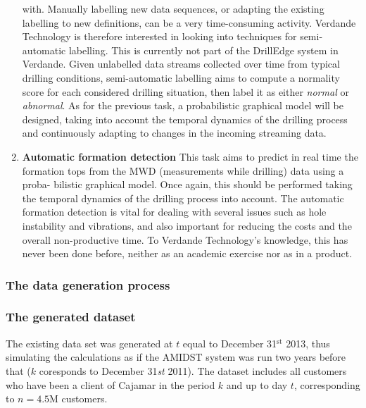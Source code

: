 \documentclass{article}
\theoremstyle{theorem}
\theoremstyle{definition}
\begin{document}
\begin{enumerate}
with. Manually labelling new data sequences, or adapting the existing labelling to
new definitions, can be a very time-consuming activity. Verdande Technology is
therefore interested in looking into techniques for semi-automatic labelling. This
is currently not part of the DrillEdge system in Verdande.
Given unlabelled data streams collected over time from typical drilling conditions,
semi-automatic labelling aims to compute a normality score for each considered
drilling situation, then label it as either \emph{normal} or \emph{abnormal}. As for the
previous task, a probabilistic graphical model will be designed, taking into account
the temporal dynamics of the drilling process and continuously adapting to changes
in the incoming streaming data.
\item {\bf Automatic formation detection}
This task aims to predict in real time the formation tops from the MWD (measurements while drilling) data using a proba-
bilistic graphical model. Once again, this should be performed taking the temporal
dynamics of the drilling process into account. The automatic formation detection
is vital for dealing with several issues such as hole instability and vibrations, and
also important for reducing the costs and the overall non-productive time. To
Verdande Technology's knowledge, this has never been done before, neither as an
academic exercise nor as in a product.
\end{enumerate}





\subsubsection{The data generation process}


\subsubsection{The generated dataset}

The existing data set was generated at $t$ equal to December 31$^\text{st}$ 2013, thus simulating the calculations as if the AMIDST system was run two years before that ($k$ coresponds to December 31\textit{st} 2011). 
The dataset includes all customers who have been a client of Cajamar in the period  $k$ and up to day $t$, corresponding to $n=4.5\text{M}$ customers. 
\end{document}
